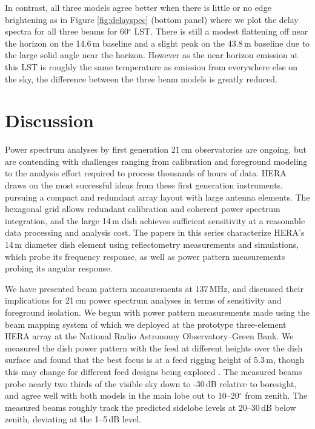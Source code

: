 \documentclass{emulateapj}
\begin{document}
In contrast, all three models agree better when there is little or no edge brightening as in Figure \ref{fig:delayspec} (bottom panel) where we plot the delay spectra for all three beams for 60$^\circ$ LST. There is still a modest flattening off near the horizon on the 14.6\,m baseline and a slight peak on the 43.8\,m baseline due to the large solid angle near the horizon. However as the near horizon emission at this LST is roughly the same temperature as emission from everywhere else on the sky, the difference between the three beam models is greatly reduced.

\section{Discussion}

Power spectrum analyses by first generation 21\,cm observatories are ongoing, but are contending with challenges ranging from calibration and foreground modeling to the analysis effort required to process thousands of hours of data. HERA draws on the most successful ideas from these first generation instruments, pursuing a compact and redundant array layout with large antenna elements. The hexagonal grid allows redundant calibration and coherent power spectrum integration, and the large 14\,m dish achieves sufficient sensitivity at a reasonable data processing and analysis cost. The papers in this series characterize HERA's 14\,m diameter dish element using reflectometry measurements and simulations, which probe its frequency response, as well as power pattern measurements probing its angular response. 

We have presented beam pattern measurements at 137\,MHz, and discussed their implications for 21\,cm power spectrum analyses in terms of sensitivity and foreground isolation. We begun with power pattern measurements made using the beam mapping system of \citet{neben15} which we deployed at the prototype three-element HERA array at the National Radio Astronomy Observatory--Green Bank. We measured the dish power pattern with the feed at different heights over the dish surface and found that the best focus is at a feed rigging height of 5.3\,m, though this may change for different feed designs being explored \citep{feedoptimizationmemo}. The measured beams probe nearly two thirds of the visible sky down to -30\,dB relative to boresight, and agree well with both models in the main lobe out to 10--20$^\circ$ from zenith. The measured beams roughly track the predicted sidelobe levels at 20--30\,dB below zenith, deviating at the 1--5\,dB level.
\end{document}
